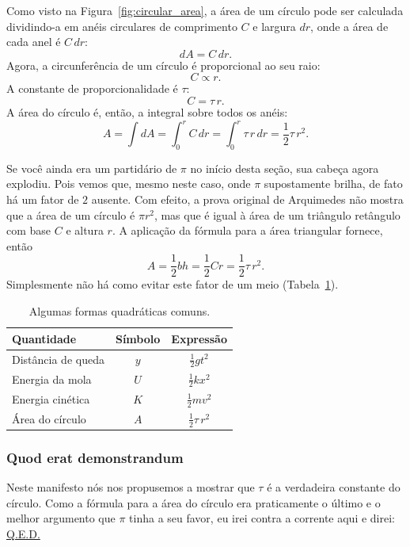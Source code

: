 Como visto na Figura~\ref{fig:circular_area}, a área de um círculo pode ser calculada dividindo-a em anéis circulares de comprimento $C$ e largura $dr$, onde a área de cada anel é $C\,dr$:
\[ dA = C\,dr. \]
Agora, a circunferência de um círculo é proporcional ao seu raio:
\[ C \propto r. \]
A constante de proporcionalidade é $\tau$:
\[ C = \tau\,r. \]
A área do círculo é, então, a integral sobre todos os anéis:
\[ A = \int dA = \int_0^r C\,dr = \int_0^r \tau\,r\,dr = \textstyle{\frac{1}{2}} \tau\,r^2. \]

Se você ainda era um partidário de $\pi$ no início desta seção, sua cabeça agora explodiu. Pois vemos que, mesmo neste caso, onde $\pi$ supostamente brilha, de fato há um fator de $2$ ausente. Com efeito, a prova original de Arquimedes não mostra que a área de um círculo é $\pi r^2$, mas que é igual à área de um triângulo retângulo com base $C$ e altura $r$. A aplicação da fórmula para a área triangular fornece, então
\[
  A = \textstyle{\frac{1}{2}} bh = \textstyle{\frac{1}{2}}Cr = \textstyle{\frac{1}{2}}\tau\,r^2.
\]
Simplesmente não há como evitar este fator de um meio (Tabela~\ref{table:quadratic_forms}).

\begin{table}
\begin{center}
\begin{tabular}{lcc}
Quantidade & Símbolo & Expressão \\ \hline
Distância de queda & $y$ & $\textstyle{\frac{1}{2}}gt^2$ \smallskip \\
Energia da mola & $U$ & $\textstyle{\frac{1}{2}}kx^2$ \smallskip \\
Energia cinética & $K$ & $\textstyle{\frac{1}{2}}mv^2$ \smallskip \\
Área do círculo & $A$ & $\textstyle{\frac{1}{2}}\tau\,r^2$
\end{tabular}
\end{center}
\caption{Algumas formas quadráticas comuns.\label{table:quadratic_forms}}
\end{table}

    \subsubsection{Quod erat demonstrandum} %
    \label{sec:quod_erat_demonstrandum}

Neste manifesto nós nos propusemos a mostrar que $\tau$ é a verdadeira constante do círculo. Como a fórmula para a área do círculo era praticamente o último e o melhor argumento que $\pi$ tinha a seu favor, eu irei contra a corrente aqui e direi: \href{https://pt.wikipedia.org/wiki/Quod_erat_demonstrandum}{Q.E.D.}


